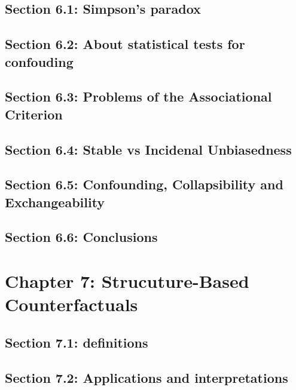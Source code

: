 \documentclass[oneside]{book}
\begin{document}
\section{Section 6.1: Simpson's paradox}



\section{Section 6.2: About statistical tests for confouding}



\section{Section 6.3: Problems of the Associational Criterion}



\section{Section 6.4: Stable vs Incidenal Unbiasedness}



\section{Section 6.5: Confounding, Collapsibility and Exchangeability}



\section{Section 6.6: Conclusions}



\chapter{Chapter 7: Strucuture-Based Counterfactuals}

\section{Section 7.1: definitions}



\section{Section 7.2: Applications and interpretations}
\end{document}
